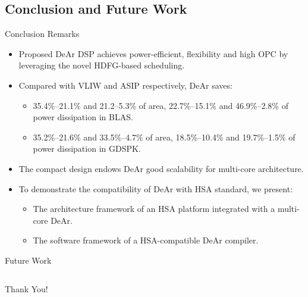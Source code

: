 \documentclass{beamer}
\begin{document}
\begin{CJK}{UTF8}{bkai}
    \section{Conclusion and Future Work}
    \begin{frame}{Conclusion Remarks}
        \begin{itemize}
            \item Proposed DeAr DSP achieves power-efficient, flexibility and high OPC by leveraging the novel HDFG-based scheduling.
            \item Compared with VLIW and ASIP respectively, DeAr saves:
                \begin{itemize}
                    \item 35.4\%--21.1\% and 21.2--5.3\% of area, 22.7\%--15.1\% and 46.9\%--2.8\% of power dissipation in BLAS.
                    \item 35.2\%--21.6\% and 33.5\%--4.7\% of area, 18.5\%--10.4\% and 19.7\%--1.5\% of power dissipation in GDSPK.
                \end{itemize}
            \item The compact design endows DeAr good scalability for multi-core architecture.
            \item To demonstrate the compatibility of DeAr with HSA standard, we present:
                \begin{itemize}
                    \item The architecture framework of an HSA platform integrated with a multi-core DeAr.
                    \item The software framework of a HSA-compatible DeAr compiler.
                \end{itemize}
        \end{itemize}
    \end{frame}

    \begin{frame}{Future Work}
        \begin{columns}
            \begin{column}{0.5\textwidth}
                
            \end{column}
            \begin{column}{0.5\textwidth}
                
            \end{column}
        \end{columns}
    
    \end{frame}

    \begin{frame}[plain,c]
        \centering
        \Huge{Thank You!}
    \end{frame}
\end{CJK}
\end{document}
